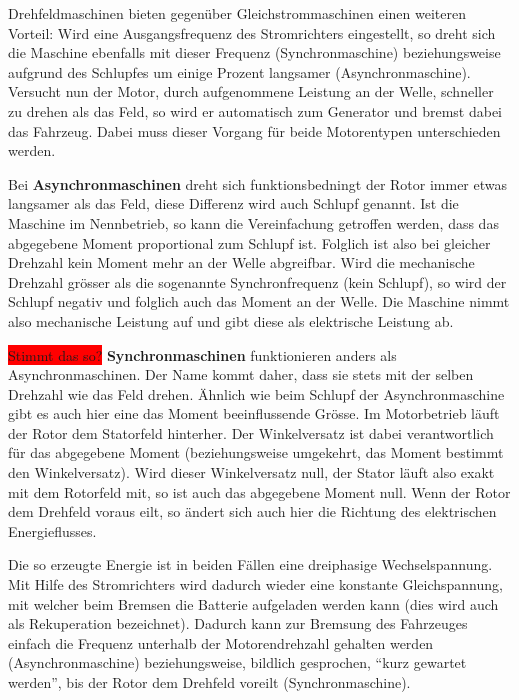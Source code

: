 Drehfeldmaschinen bieten gegenüber Gleichstrommaschinen einen weiteren Vorteil: Wird eine Ausgangsfrequenz des Stromrichters eingestellt, so dreht sich die Maschine ebenfalls mit dieser Frequenz (Synchronmaschine) beziehungsweise aufgrund des Schlupfes um einige Prozent langsamer (Asynchronmaschine). Versucht nun der Motor, durch aufgenommene Leistung an der Welle, schneller zu drehen als das Feld, so wird er automatisch zum Generator und bremst dabei das Fahrzeug. Dabei muss dieser Vorgang für beide Motorentypen unterschieden werden.

Bei \textbf{Asynchronmaschinen} dreht sich funktionsbedningt der Rotor immer etwas langsamer als das Feld, diese Differenz wird auch Schlupf genannt. Ist die Maschine im Nennbetrieb, so kann die Vereinfachung getroffen werden, dass das abgegebene Moment proportional zum Schlupf ist. Folglich ist also bei gleicher Drehzahl kein Moment mehr an der Welle abgreifbar. Wird die mechanische Drehzahl grösser als die sogenannte Synchronfrequenz (kein Schlupf), so wird der Schlupf negativ und folglich auch das Moment an der Welle. Die Maschine nimmt also mechanische Leistung auf und gibt diese als elektrische Leistung ab.

\colorbox{red}{Stimmt das so?}
\textbf{Synchronmaschinen} funktionieren anders als Asynchronmaschinen. Der Name kommt daher, dass sie stets mit der selben Drehzahl wie das Feld drehen. Ähnlich wie beim Schlupf der Asynchronmaschine gibt es auch hier eine das Moment beeinflussende Grösse. Im Motorbetrieb läuft der Rotor dem Statorfeld hinterher. Der Winkelversatz ist dabei verantwortlich für das abgegebene Moment (beziehungsweise umgekehrt, das Moment bestimmt den Winkelversatz). Wird dieser Winkelversatz null, der Stator läuft also exakt mit dem Rotorfeld mit, so ist auch das abgegebene Moment null. Wenn der Rotor dem Drehfeld voraus eilt, so ändert sich auch hier die Richtung des elektrischen Energieflusses.

Die so erzeugte Energie ist in beiden Fällen eine dreiphasige Wechselspannung. Mit Hilfe des Stromrichters wird dadurch wieder eine konstante Gleichspannung, mit welcher beim Bremsen die Batterie aufgeladen werden kann (dies wird auch als Rekuperation bezeichnet). Dadurch kann zur Bremsung des Fahrzeuges einfach die Frequenz unterhalb der Motorendrehzahl gehalten werden (Asynchronmaschine) beziehungsweise, bildlich gesprochen, "`kurz gewartet werden"', bis der Rotor dem Drehfeld voreilt (Synchronmaschine).

